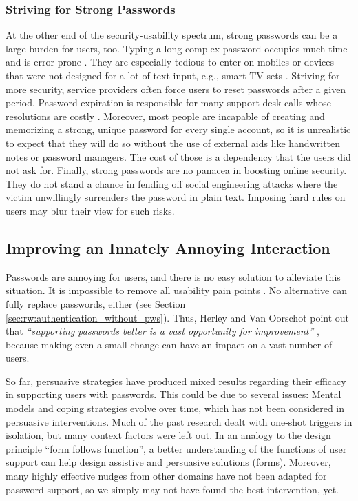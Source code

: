 \subsubsection{Striving for Strong Passwords}
At the other end of the security-usability spectrum, strong passwords can be a large burden for users, too. Typing a long complex password occupies much time and is error prone \cite{Shay2014CanLongPasswordsBeSecureAndUsable}. They are especially tedious to enter on mobiles or devices that were not designed for a lot of text input, e.g., smart TV sets \cite{Melicher2016UsabilityMobileTextPasswords}. Striving for more security, service providers often force users to reset passwords after a given period. Password expiration is responsible for many support desk calls whose resolutions are costly \cite{Adams1999UsersEnemy, Sasse2005UsableSecurityPosition}. Moreover, most people are incapable of creating and memorizing a strong, unique password for every single account, so it is unrealistic to expect that they will do so without the use of external aids like handwritten notes or password managers. The cost of those is a dependency that the users did not ask for. Finally, strong passwords are no panacea in boosting online security. They do not stand a chance in fending off social engineering attacks where the victim unwillingly surrenders the password in plain text. Imposing hard rules on users may blur their view for such risks. 

\subsection{Improving an Innately Annoying Interaction}
Passwords are annoying for users, and there is no easy solution to alleviate this situation. It is impossible to remove all usability pain points \cite{Bonneau2012ReplacePasswords}. No alternative can fully replace passwords, either (see Section \ref{sec:rw:authentication_without_pws}). Thus, Herley and Van Oorschot point out that \textit{``supporting passwords better is a vast opportunity for improvement''} \cite{Herley2012PersistenceOfPasswords}, because making even a small change can have an impact on a vast number of users. 

So far, persuasive strategies have produced mixed results regarding their efficacy in supporting users with passwords. This could be due to several issues: Mental models and coping strategies evolve over time, which has not been considered in persuasive interventions. Much of the past research dealt with one-shot triggers in isolation, but many context factors were left out. In an analogy to the design principle ``form follows function'', a better understanding of the functions of user support can help design assistive and persuasive solutions (forms). Moreover, many highly effective nudges from other domains have not been adapted for password support, so we simply may not have found the best intervention, yet. 

